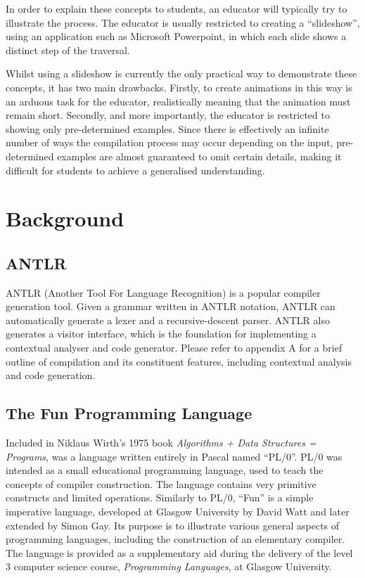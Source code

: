 \documentclass{l4proj}
\begin{document}
In order to explain these concepts to students, an educator will typically try to illustrate the process. The educator is usually restricted to creating a ``slideshow'', using an application such as Microsoft Powerpoint, in which each slide shows a distinct step of the traversal. 

Whilst using a slideshow is currently the only practical way to demonstrate these concepts, it has two main drawbacks. Firstly, to create animations in this way is an arduous task for the educator, realistically meaning that the animation must remain short. Secondly, and more importantly, the educator is restricted to showing only pre-determined examples. Since there is effectively an infinite number of ways the compilation process may occur depending on the input, pre-determined examples are almost guaranteed to omit certain details, making it difficult for students to achieve a generalised understanding.

\section{Background}
\subsection{ANTLR}
ANTLR (Another Tool For Language Recognition) is a popular compiler generation tool. Given a grammar written in ANTLR notation, ANTLR can automatically generate a lexer and a recursive-descent parser. ANTLR also generates a visitor interface, which is the foundation for implementing a contextual analyser and code generator. Please refer to appendix A for a brief outline of compilation and its constituent features, including contextual analysis and code generation.

\subsection{The Fun Programming Language}
Included in Niklaus Wirth's 1975 book {\it Algorithms + Data Structures = Programs}, was a language written entirely in Pascal named ``PL/0''. PL/0 was intended as a small educational programming language, used to teach the concepts of compiler construction. The language contains very primitive constructs and limited operations. Similarly to PL/0, ``Fun'' is a simple imperative language, developed at Glasgow University by David Watt and later extended by Simon Gay. Its purpose is to illustrate various general aspects of programming languages, including the construction of an elementary compiler. The language is provided as a supplementary aid during the delivery of the level 3 computer science course, {\it Programming Languages}, at Glasgow University.
\end{document}
